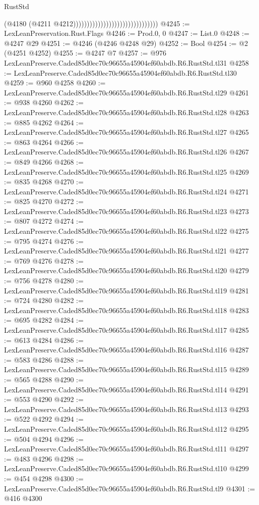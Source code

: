 \begin{lexlean}{RustStd}
\begin{coremodule}
                                                              (@4180
                                                                (@4211
                                                                  @4212)))))))))))))))))))))))))))))))
@4245 := LexLeanPreservation.Rust.Flags
@4246 := Prod.{0, 0}
@4247 := List.{0}
@4248 := @4247 @29
@4251 := @4246 (@4246 @4248 @29)
@4252 := Bool
@4254 := @2 (@4251 @4252)
@4255 := @4247 @7
@4257 := @976 LexLeanPreserve.Caded85d0ec70c96655a45904ef60abdb.R6.RustStd.tl31
@4258 := LexLeanPreserve.Caded85d0ec70c96655a45904ef60abdb.R6.RustStd.tl30
@4259 := @960 @4258
@4260 := LexLeanPreserve.Caded85d0ec70c96655a45904ef60abdb.R6.RustStd.tl29
@4261 := @938 @4260
@4262 := LexLeanPreserve.Caded85d0ec70c96655a45904ef60abdb.R6.RustStd.tl28
@4263 := @885 @4262
@4264 := LexLeanPreserve.Caded85d0ec70c96655a45904ef60abdb.R6.RustStd.tl27
@4265 := @863 @4264
@4266 := LexLeanPreserve.Caded85d0ec70c96655a45904ef60abdb.R6.RustStd.tl26
@4267 := @849 @4266
@4268 := LexLeanPreserve.Caded85d0ec70c96655a45904ef60abdb.R6.RustStd.tl25
@4269 := @835 @4268
@4270 := LexLeanPreserve.Caded85d0ec70c96655a45904ef60abdb.R6.RustStd.tl24
@4271 := @825 @4270
@4272 := LexLeanPreserve.Caded85d0ec70c96655a45904ef60abdb.R6.RustStd.tl23
@4273 := @807 @4272
@4274 := LexLeanPreserve.Caded85d0ec70c96655a45904ef60abdb.R6.RustStd.tl22
@4275 := @795 @4274
@4276 := LexLeanPreserve.Caded85d0ec70c96655a45904ef60abdb.R6.RustStd.tl21
@4277 := @769 @4276
@4278 := LexLeanPreserve.Caded85d0ec70c96655a45904ef60abdb.R6.RustStd.tl20
@4279 := @756 @4278
@4280 := LexLeanPreserve.Caded85d0ec70c96655a45904ef60abdb.R6.RustStd.tl19
@4281 := @724 @4280
@4282 := LexLeanPreserve.Caded85d0ec70c96655a45904ef60abdb.R6.RustStd.tl18
@4283 := @695 @4282
@4284 := LexLeanPreserve.Caded85d0ec70c96655a45904ef60abdb.R6.RustStd.tl17
@4285 := @613 @4284
@4286 := LexLeanPreserve.Caded85d0ec70c96655a45904ef60abdb.R6.RustStd.tl16
@4287 := @583 @4286
@4288 := LexLeanPreserve.Caded85d0ec70c96655a45904ef60abdb.R6.RustStd.tl15
@4289 := @565 @4288
@4290 := LexLeanPreserve.Caded85d0ec70c96655a45904ef60abdb.R6.RustStd.tl14
@4291 := @553 @4290
@4292 := LexLeanPreserve.Caded85d0ec70c96655a45904ef60abdb.R6.RustStd.tl13
@4293 := @522 @4292
@4294 := LexLeanPreserve.Caded85d0ec70c96655a45904ef60abdb.R6.RustStd.tl12
@4295 := @504 @4294
@4296 := LexLeanPreserve.Caded85d0ec70c96655a45904ef60abdb.R6.RustStd.tl11
@4297 := @483 @4296
@4298 := LexLeanPreserve.Caded85d0ec70c96655a45904ef60abdb.R6.RustStd.tl10
@4299 := @454 @4298
@4300 := LexLeanPreserve.Caded85d0ec70c96655a45904ef60abdb.R6.RustStd.tl9
@4301 := @416 @4300

\end{coremodule}
\end{lexlean}

